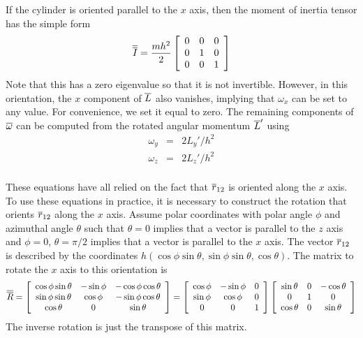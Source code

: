 \documentclass[12pt]{article}
\begin{document}
If the cylinder is oriented parallel to the $x$ axis, then the moment of inertia tensor
has the simple form
\[
\overline{\overline{I}} = \frac{mh^2}{2}\left[\begin{array}{ccc}
0 & 0 & 0\\
0 & 1 & 0\\
0 & 0 & 1\\
\end{array}\right]
\]
Note that this has a zero eigenvalue so that it is not invertible. However, in this
orientation, the $x$ component of $\overline{L}$ also vanishes, implying that $\omega_x$ can be
set to any value. For convenience, we set it equal to zero.
The remaining components of $\overline{\omega}$ can be computed from the rotated angular momentum
$\overline{L}'$ using
\begin{eqnarray*}
\omega_y & = & 2L_y'/h^2 \\
\omega_z & = & 2L_z'/h^2 \\
\end{eqnarray*}

These equations have all relied on the fact that $\overline{r}_{12}$ is oriented along the
$x$ axis. To use these equations in practice, it is necessary to construct the rotation
that orients $\overline{r}_{12}$ along the $x$ axis. Assume polar coordinates with polar
angle $\phi$ and azimuthal angle $\theta$ such that $\theta = 0$ implies that a vector
is parallel to the $z$ axis and $\phi = 0$, $\theta = \pi/2$ implies that a vector is
parallel to the $x$ axis. The vector $\overline{r}_{12}$ is described by the coordinates
$h(\cos\phi\sin\theta,\sin\phi\sin\theta,\cos\theta)$. The matrix to rotate the $x$ axis
to this orientation is
\[
\overline{\overline{R}}=\left[\begin{array}{ccc}
\cos\phi\sin\theta & -\sin\phi & -\cos\phi\cos\theta \\
\sin\phi\sin\theta & \cos\phi & -\sin\phi\cos\theta \\
\cos\theta & 0 & \sin\theta
\end{array}\right]
=\left[\begin{array}{ccc}
\cos\phi & -\sin\phi & 0 \\
\sin\phi & \cos\phi & 0 \\
0 & 0 & 1\end{array}\right]
\left[\begin{array}{ccc}
\sin\theta & 0 & -\cos\theta \\
0 & 1 & 0 \\
\cos\theta & 0 & \sin\theta
\end{array}\right]
\]
The inverse rotation is just the transpose of this matrix.
\end{document}
